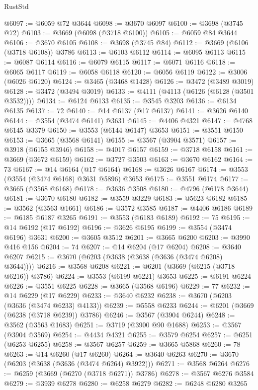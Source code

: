 \begin{lexlean}{RustStd}
\begin{coremodule}
@6097 := @6059 @72 @3644
@6098 := @3670 @6097
@6100 := @3698 (@3745 @72)
@6103 := @3669 (@6098 (@3718 @6100))
@6105 := @6059 @84 @3644
@6106 := @3670 @6105
@6108 := @3698 (@3745 @84)
@6112 := @3669 (@6106 (@3718 @6108)) @3786
@6113 := @6103 @6112
@6114 := @6095 @6113
@6115 := @6087 @6114
@6116 := @6079 @6115
@6117 := @6071 @6116
@6118 := @6065 @6117
@6119 := @6058 @6118
@6120 := @6056 @6119
@6122 := @3006 (@6026 @6120)
@6124 := @3465 (@3468 @1428)
@6126 := @3472 (@3489 @3019)
@6128 := @3472 (@3494 @3019)
@6133 := @4111 (@4113 (@6126 (@6128 (@3501 @3532))))
@6134 := @6124 @6133
@6135 := @3545 @3203
@6136 := @6134 @6135
@6137 := 72
@6140 := @14 @6137 (@17 @6137)
@6141 := @3626 @6140
@6144 := @3554 (@3474 @6141) @3631
@6145 := @4406 @4321
@6147 := @4768 @6145 @3379
@6150 := @3553 (@6144 @6147) @3653
@6151 := @3551 @6150
@6153 := @3665 (@3568 @6141)
@6155 := @3567 (@3904 @3571)
@6157 := @3918 (@6155 @3946)
@6158 := @4017 @6157
@6159 := @3718 @6158
@6161 := @3669 (@3672 @6159)
@6162 := @3727 @3503
@6163 := @3670 @6162
@6164 := 73
@6167 := @14 @6164 (@17 @6164)
@6168 := @3626 @6167
@6174 := @3553 (@3554 (@3474 @6168) @3631 @5896) @3653
@6175 := @3551 @6174
@6177 := @3665 (@3568 @6168)
@6178 := @3636 @3508
@6180 := @4796 (@6178 @3644)
@6181 := @3670 @6180
@6182 := @3559 @3229
@6183 := @5623 @6182
@6185 := @3562 (@3563 @1661)
@6186 := @3572 @3585
@6187 := @4406 @6186
@6189 := @6185 @6187 @3265
@6191 := @3553 (@6183 @6189)
@6192 := 75
@6195 := @14 @6192 (@17 @6192)
@6196 := @3626 @6195
@6199 := @3554 (@3474 @6196) @3631
@6200 := @3605 @3512
@6201 := @3665 @6200
@6203 := @3990 @416 @156
@6204 := 74
@6207 := @14 @6204 (@17 @6204)
@6208 := @3640 @6207
@6215 := @3670 (@6203 (@3638 (@3638 (@3636 (@3474 @6208) @3644))))
@6216 := @3568 @6208
@6221 := @6201 (@3669 (@6215 (@3718 @6216)) @3786)
@6224 := @3553 (@6199 @6221) @3653
@6225 := @6191 @6224
@6226 := @3551 @6225
@6228 := @3665 (@3568 @6196)
@6229 := 77
@6232 := @14 @6229 (@17 @6229)
@6233 := @3640 @6232
@6238 := @3670 (@6203 (@3636 (@3474 @6233) @4133))
@6239 := @5558 @6233
@6244 := @6201 (@3669 (@6238 (@3718 @6239)) @3786)
@6246 := @3567 (@3904 @6244)
@6248 := @3562 (@3563 @1683)
@6251 := @3719 (@3900 @90 @1688)
@6253 := @3567 (@3904 @3569)
@6254 := @4434 @4321
@6255 := @3579 @6254
@6257 := @6251 (@6253 @6255)
@6258 := @3567 @6257
@6259 := @3665 @5868
@6260 := 78
@6263 := @14 @6260 (@17 @6260)
@6264 := @3640 @6263
@6270 := @3670 (@6203 (@3638 (@3636 (@3474 @6264) @3922)))
@6271 := @3568 @6264
@6276 := @6259 (@3669 (@6270 (@3718 @6271)) @3786)
@6278 := @3567 @6276 @3584
@6279 := @3939 @6278
@6280 := @6258 @6279
@6282 := @6248 @6280 @3265

\end{coremodule}
\end{lexlean}
